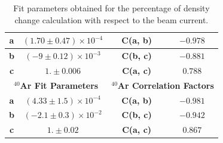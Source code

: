 \documentclass[final,5p,times,twocolumn]{elsarticle}
\begin{document}
\begin{table}[!h]
\begin{tabular}{|c|c|l|c|c|l|}
\textbf{a}              & \multicolumn{2}{c|}{$(1.70 \pm 0.47) \times 10^{-4}$ }               & \textbf{C(a, b)}             & \multicolumn{2}{c|}{$-0.978$} \\ \hline
\textbf{b}              & \multicolumn{2}{c|}{$(-9 \pm 0.12) \times 10^{-3}$   }                & \textbf{C(b, c)}             & \multicolumn{2}{c|}{$-0.881$} \\ \hline
\textbf{c}              & \multicolumn{2}{c|}{$1. \pm 0.006$}                        & \textbf{C(a, c)}             & \multicolumn{2}{c|}{$0.788$}  \\ \hline
\multicolumn{3}{|c|}{\textbf{$^{40}$Ar Fit Parameters}}                              & \multicolumn{3}{c|}{\textbf{$^{40}$Ar Correlation Factors}}  \\ \hline
\textbf{a}              & \multicolumn{2}{c|}{$(4.33 \pm 1.5) \times 10^{-4}$}               & \textbf{C(a, b)}             & \multicolumn{2}{c|}{$-0.981$} \\ \hline
\textbf{b}              & \multicolumn{2}{c|}{$(-2.1 \pm 0.3) \times 10^{-2}$}                    & \textbf{C(b, c)}             & \multicolumn{2}{c|}{$-0.942$} \\ \hline
\textbf{c}              & \multicolumn{2}{c|}{$1. \pm 0.02$}                         & \textbf{C(a, c)}             & \multicolumn{2}{c|}{$0.867$}  \\ \hline
\end{tabular}
\caption{Fit parameters obtained for the percentage of density change calculation with respect to the beam current.}
\label{tab:fit_parameters}
\end{table}
\end{document}
